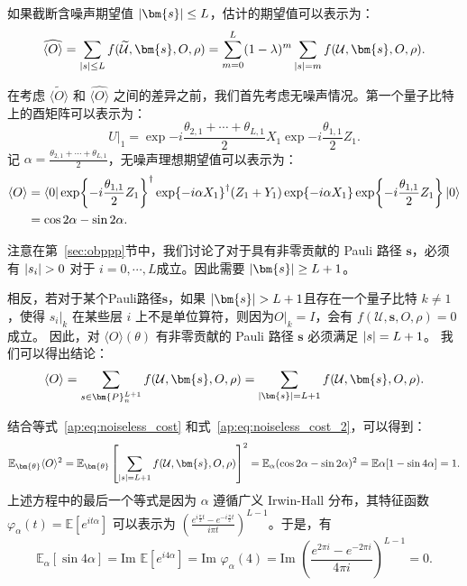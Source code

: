 如果截断含噪声期望值 $\abs{\bm{s}}\leq L$，估计的期望值可以表示为： 
\begin{equation} 
    \widehat{\langle O \rangle}=\sum_{\abs{s}\leq L} f(\widetilde{\mathcal{U}},\bm{s},O,\rho)=\sum_{m=0}^L (1-\lambda)^m \sum_{\abs{s}=m} f(\mathcal{U},\bm{s},O,\rho).
\end{equation}

在考虑 $\widetilde{\langle O \rangle}$ 和 $\widehat{\langle O \rangle}$ 之间的差异之前，我们首先考虑无噪声情况。第一个量子比特上的酉矩阵可以表示为： 
\begin{equation} 
    U|_1=\exp{-i\frac{\theta_{2,1}+\cdots+\theta_{L,1} }{2}X_1}\exp{-i\frac{\theta_{1,1}}{2}Z_1}.
\end{equation} 
记 $\alpha=\frac{\theta_{2,1}+\cdots+\theta_{L,1} }{2}$，无噪声理想期望值可以表示为： 
\begin{equation}\label{ap:eq:noiseless_cost} 
    \begin{aligned} 
        \langle O \rangle&=\bra{0}\exp{-i\frac{\theta_{1,1}}{2}Z_1}^\dagger\exp{-i \alpha X_1}^\dagger (Z_1+Y_1) \exp{-i \alpha X_1}\exp{-i\frac{\theta_{1,1}}{2}Z_1}\ket{0}\\
        &=\cos{2\alpha}-\sin{2\alpha}. 
    \end{aligned} 
\end{equation}

注意在第~\ref{sec:obppp}节中，我们讨论了对于具有非零贡献的 Pauli 路径 $\bm{s}$，必须有 $\abs{s_i} > 0$ 对于 $i=0,\cdots,L$成立。因此需要 $\abs{\bm{s}}\geq L+1$。

相反，若对于某个Pauli路径$\bm{s}$，如果 $\abs{\bm{s}}> L+1$且存在一个量子比特 $k\neq 1$，使得 $s_{i}|_k$ 在某些层 $i$ 上不是单位算符，则因为$O|_k=I$，会有 $f(\mathcal{U},\bm{s},O,\rho)=0$ 成立。
因此，对 $\langle O \rangle(\theta)$ 有非零贡献的 Pauli 路径 $\bm{s}$ 必须满足 $\abs{s}=L+1$。 
我们可以得出结论： 
\begin{equation}\label{ap:eq:noiseless_cost_2} 
    \begin{aligned} \langle O \rangle=\sum_{s\in \bm{P}^{L+1}_n} f(\mathcal{U},\bm{s},O,\rho)=\sum_{\abs{\bm{s}}=L+1} f(\mathcal{U},\bm{s},O,\rho).
    \end{aligned} 
\end{equation}

结合等式~\eqref{ap:eq:noiseless_cost} 和式~\eqref{ap:eq:noiseless_cost_2}，可以得到： 
\begin{equation} 
    \mathbb{E}_{\bm{\theta}}\langle O \rangle^2=\mathbb{E}_{\bm{\theta}} \left[\sum_{\abs{s}=L+1} f(\mathcal{U},\bm{s},O,\rho) \right]^2=\mathbb{E}_{\alpha}(\cos{2\alpha}-\sin{2\alpha})^2=\mathbb{E}{\alpha}[1-\sin4\alpha]=1. 
\end{equation} 
上述方程中的最后一个等式是因为 $\alpha$ 遵循广义 Irwin-Hall 分布，其特征函数 $\varphi_{\alpha}(t)=\mathbb{E}[e^{it\alpha}]$ 可以表示为 $\left(\frac{e^{i\frac{\pi}{2}t}-e^{-i\frac{\pi}{2}t}}{i\pi t}\right)^{L-1}$。于是，有 
\begin{equation} 
    \mathbb{E}_{\alpha}[\sin4\alpha]=\textrm{Im }\mathbb{E}[e^{i4\alpha}]=\textrm{Im }\varphi_{\alpha}(4)=\textrm{Im }\left(\frac{e^{2\pi i}-e^{-2\pi i}}{4\pi i}\right)^{L-1}=0.
\end{equation}

